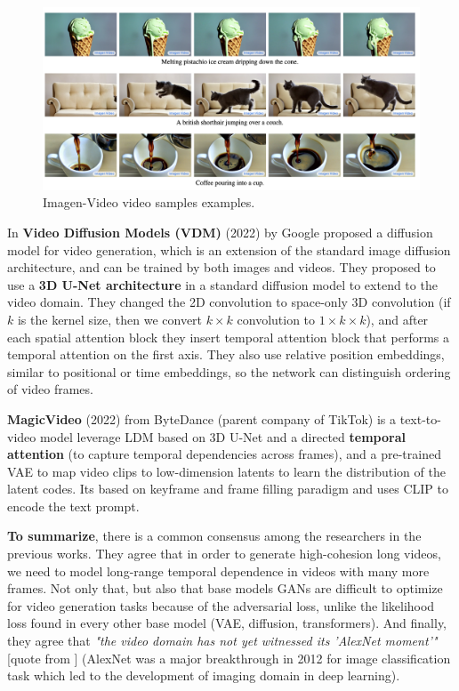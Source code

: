 \begin{figure}
    \centering
    \includegraphics[width=1\textwidth]{images/video_synthesis/imagen_video.png}
    \caption{Imagen-Video video samples examples.}
\end{figure}

In \textbf{Video Diffusion Models (VDM)} \cite{video_diffusion_models} (2022) by Google proposed a diffusion model for video generation, which is an extension of the standard image diffusion architecture, and can be trained by both images and videos. They proposed to use a \textbf{3D U-Net architecture} in a standard diffusion model to extend to the video domain. They changed the 2D convolution to space-only 3D convolution (if $k$ is the kernel size, then we convert $k\times k$ convolution to $1\times k\times k$), and after each spatial attention block they insert temporal attention block that performs a temporal attention on the first axis. They also use relative position embeddings, similar to positional or time embeddings, so the network can distinguish ordering of video frames.

\textbf{MagicVideo} (2022) \cite{magic_video} from ByteDance (parent company of TikTok) is a text-to-video model leverage LDM based on 3D U-Net and a directed \textbf{temporal attention} (to capture temporal dependencies across frames), and a pre-trained VAE to map video clips to low-dimension latents to learn the distribution of the latent codes. Its based on keyframe and frame filling paradigm and uses CLIP to encode the text prompt.

\textbf{To summarize}, there is a common consensus among the researchers in the previous works. They agree that in order to generate high-cohesion long videos, we need to model long-range temporal dependence in videos with many more frames. Not only that, but also that base models GANs are difficult to optimize for video generation tasks because of the adversarial loss, unlike the likelihood loss found in every other base model (VAE, diffusion, transformers). And finally, they agree that \textit{"the video domain has not yet witnessed its 'AlexNet moment'"} [quote from \cite{tran2018closer}] (AlexNet \cite{alexnet} was a major breakthrough in 2012 for image classification task which led to the development of imaging domain in deep learning). 






